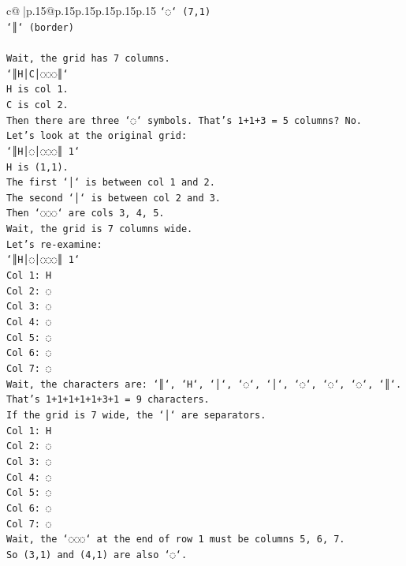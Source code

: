 \documentclass{article}
\begin{document}
{\begin{supertabular}{c@{$\;$}|p{.15\linewidth}@{}p{.15\linewidth}p{.15\linewidth}p{.15\linewidth}p{.15\linewidth}p{.15\linewidth}}
{{{\texttt{`◌` (7,1)} \\
\texttt{`║` (border)} \\
\\ 
\texttt{Wait, the grid has 7 columns.} \\
\texttt{`║H│C│◌◌◌║`} \\
\texttt{H is col 1.} \\
\texttt{C is col 2.} \\
\texttt{Then there are three `◌` symbols. That's 1+1+3 = 5 columns? No.} \\
\texttt{Let's look at the original grid:} \\
\texttt{`║H│◌│◌◌◌║ 1`} \\
\texttt{H is (1,1).} \\
\texttt{The first `│` is between col 1 and 2.} \\
\texttt{The second `│` is between col 2 and 3.} \\
\texttt{Then `◌◌◌` are cols 3, 4, 5.} \\
\texttt{Wait, the grid is 7 columns wide.} \\
\texttt{Let's re{-}examine:} \\
\texttt{`║H│◌│◌◌◌║ 1`} \\
\texttt{Col 1: H} \\
\texttt{Col 2: ◌} \\
\texttt{Col 3: ◌} \\
\texttt{Col 4: ◌} \\
\texttt{Col 5: ◌} \\
\texttt{Col 6: ◌} \\
\texttt{Col 7: ◌} \\
\texttt{Wait, the characters are: `║`, `H`, `│`, `◌`, `│`, `◌`, `◌`, `◌`, `║`.} \\
\texttt{That's 1+1+1+1+1+3+1 = 9 characters.} \\
\texttt{If the grid is 7 wide, the `│` are separators.} \\
\texttt{Col 1: H} \\
\texttt{Col 2: ◌} \\
\texttt{Col 3: ◌} \\
\texttt{Col 4: ◌} \\
\texttt{Col 5: ◌} \\
\texttt{Col 6: ◌} \\
\texttt{Col 7: ◌} \\
\texttt{Wait, the `◌◌◌` at the end of row 1 must be columns 5, 6, 7.} \\
\texttt{So (3,1) and (4,1) are also `◌`.} \\
}}}
\end{supertabular}}
\end{document}
